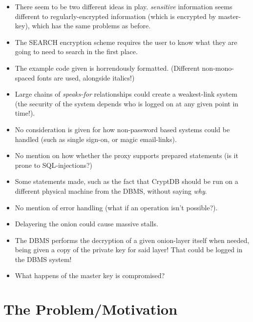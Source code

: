 \documentclass[11pt]{article}
\begin{document}
\begin{itemize}
    \item There seem to be two different ideas in play. \textit{sensitive}
    information seems different to regularly-encrypted information (which is
    encrypted by master-key), which has the same problems as before.

    \item The SEARCH encryption scheme requires the user to know what they are
    going to need to search in the first place.

    \item The example code given is horrendously formatted. (Different
    non-mono-spaced fonts are used, alongside italics!)

    \item Large chains of \textit{speaks-for} relationships could create a
    weakest-link system (the security of the system depends who is logged on at
    any given point in time!).

    \item No consideration is given for how non-password based systems could be
    handled (such as single sign-on, or magic email-links).

    \item No mention on how whether the proxy supports prepared statements (is
    it prone to SQL-injections?)

    \item Some statements made, such as the fact that CryptDB should be run on
    a different physical machine from the DBMS, without saying \textit{why}.

    \item No mention of error handling (what if an operation isn't possible?).

    \item Delayering the onion could cause massive stalls.

    \item The DBMS performs the decryption of a given onion-layer itself when
    needed, being given a copy of the private key for said layer! That could be
    logged in the DBMS system!

    \item What happens of the master key is compromised?

\end{itemize}

\section*{The Problem/Motivation}
\end{document}
